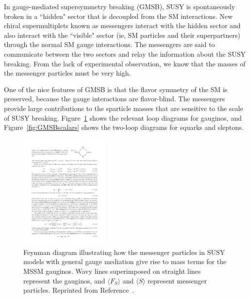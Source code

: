 In gauge-mediated supersymmetry breaking (GMSB), SUSY is spontaneously broken in a ``hidden" sector that is decoupled from the SM interactions. 
New chiral supermultiplets known as messengers interact with the hidden sector and 
also interact with the ``visible" sector (ie, SM particles and their superpartners) through the normal
SM gauge interactions. The messengers are said to communicate between the two sectors and relay the information about the SUSY breaking.
From the lack of experimental observation, we know that the masses of the messenger particles must be very high. 

One of the nice features of GMSB is that the flavor symmetry of the SM is preserved, because the gauge interactions are flavor-blind. 
The messengers provide large contributions to the sparticle masses that are sensitive to the scale of SUSY breaking. 
Figure~\ref{fig:GMSBgaugino} shows the relevant loop diagrams for gauginos, and Figure~\ref{fig:GMSBscalars}
shows the two-loop diagrams for squarks and sleptons.

\begin{figure}[htbp]
    \centering
    \includegraphics[width=0.4\textwidth]{Figures/Theory/GMSBgaugino.pdf}
    \caption{Feynman diagram illustrating how the messenger particles in SUSY models
    with general gauge mediation give rise to mass terms for the MSSM gauginos. 
    Wavy lines superimposed on straight lines represent the gauginos, and 
    $\langle F_S \rangle$ and $\langle S \rangle$ represent messenger particles.
    Reprinted from Reference~\cite{SUSYprimer}.}
    \label{fig:GMSBgaugino}
\end{figure}

